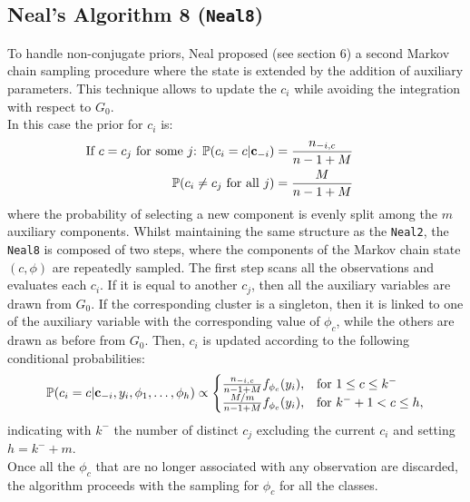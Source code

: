 \subsection{Neal's Algorithm 8 (\texttt{Neal8})} \label{neal8}
To handle non-conjugate priors, Neal proposed (see \cite{neal} section 6) a second Markov chain sampling procedure where the state is extended by the addition of auxiliary parameters.
This technique allows to update the $c_i$ while avoiding the integration with respect to $G_0$. \\
In this case the prior for $c_i$ is:
\begin{align}
            \hspace{-25pt}
            \vspace{-12pt}
                \text{If $c=c_j$ for some $j$: } \PP(c_i=c | \mathbf c_{-i}) &= \frac{n_{-i,c}}{n-1+M}   \\
                \PP(c_{i}\neq c_{j} \text{ for all } j) &=\frac{M }{n-1+M}                  \nonumber
\end{align}	
where the probability of selecting a new component is evenly split among the $m$ auxiliary components.
Whilst maintaining the same structure as the \verb|Neal2|, the \verb|Neal8| is composed of two steps, where the components of the Markov chain state $(c,\phi)$ are repeatedly sampled.
The first step scans all the observations and evaluates each $c_i$.
If it is equal to another $c_j$, then all the auxiliary variables are drawn from $G_0$.
If the corresponding cluster is a singleton, then it is linked to one of the auxiliary variable with the corresponding value of $\phi_c$, while the others are drawn as before from $G_0$.
Then, $c_i$ is updated according to the following conditional probabilities:
\begin{align}
	\mathbb P(c_{i}=c | \mathbf c_{-i}, y_{i}, \phi_{1},\dots,\phi_{h}) \propto \begin{cases}  \frac{n_{-i,c}}{n-1+M}f_{\phi_{c}}(y_{i}), & \mbox{for } 1 \leq c \leq k^{-} \\ \frac{M/m}{n-1+M}f_{\phi_{c}}(y_{i}), & \mbox{for } k^{-}+1 < c \leq h,
	\end{cases}
\end{align}
indicating with $k^{-}$ the number of distinct $c_j$ excluding the current $c_i$ and setting $h=k^{-}+m$. \\
Once all the $\phi_c$ that are no longer associated with any observation are discarded, the algorithm proceeds with the sampling for $\phi_c$ for all the classes.

